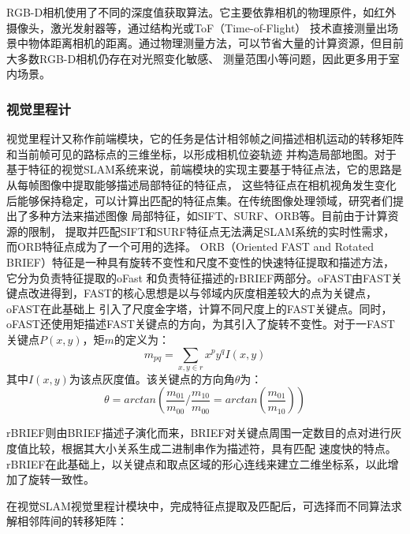 RGB-D相机使用了不同的深度值获取算法。它主要依靠相机的物理原件，如红外摄像头，激光发射器等，通过结构光或ToF（Time-of-Flight）
技术直接测量出场景中物体距离相机的距离。通过物理测量方法，可以节省大量的计算资源，但目前大多数RGB-D相机仍存在对光照变化敏感、
测量范围小等问题，因此更多用于室内场景。

\subsubsection{视觉里程计}
视觉里程计又称作前端模块，它的任务是估计相邻帧之间描述相机运动的转移矩阵和当前帧可见的路标点的三维坐标，以形成相机位姿轨迹
并构造局部地图。对于基于特征的视觉SLAM系统来说，前端模块的实现主要基于特征点法，它的思路是从每帧图像中提取能够描述局部特征的特征点，
这些特征点在相机视角发生变化后能够保持稳定，可以计算出匹配的特征点集。在传统图像处理领域，研究者们提出了多种方法来描述图像
局部特征，如SIFT\citep{LoweDistinctive}、SURF\citep{Bay2006SURF}、ORB\citep{Rublee2012ORB}等。目前由于计算资源的限制，
提取并匹配SIFT和SURF特征点无法满足SLAM系统的实时性需求，而ORB特征点成为了一个可用的选择。
ORB（Oriented FAST and Rotated BRIEF）特征是一种具有旋转不变性和尺度不变性的快速特征提取和描述方法，它分为负责特征提取的oFast
和负责特征描述的rBRIEF两部分。oFAST由FAST关键点改进得到，FAST的核心思想是以与邻域内灰度相差较大的点为关键点，oFAST在此基础上
引入了尺度金字塔，计算不同尺度上的FAST关键点。同时，oFAST还使用矩描述FAST关键点的方向，为其引入了旋转不变性。对于一FAST关键点$P(x,y)$，矩$m$的定义为：
$$m_{pq}=\sum_{x,y \in r} x^{p}y^{q}I(x,y)$$
其中$I(x,y)为$该点灰度值。该关键点的方向角$\theta$为：
$$\theta =arctan\left(\frac{m_{01}}{m_{00}}/\frac{m_{10}}{m_{00}}=arctan(\frac{m_{01}}{m_{10}})\right)$$

rBRIEF则由BRIEF描述子演化而来，BRIEF对关键点周围一定数目的点对进行灰度值比较，根据其大小关系生成二进制串作为描述符，具有匹配
速度快的特点。rBRIEF在此基础上，以关键点和取点区域的形心连线来建立二维坐标系，以此增加了旋转一致性。

在视觉SLAM视觉里程计模块中，完成特征点提取及匹配后，可选择而不同算法求解相邻阵间的转移矩阵：

